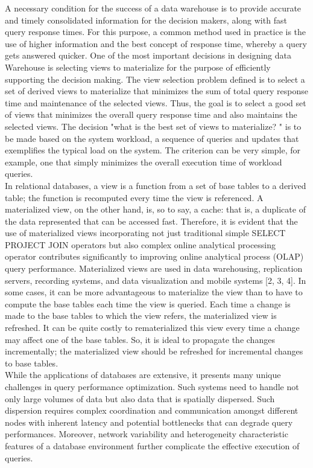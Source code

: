 A necessary condition for the success of a data warehouse is to provide accurate and timely consolidated information for the decision makers, along with fast query response times. For this purpose, a common method used in practice is the use of higher information and the best concept of response time, whereby a query gets answered quicker. One of the most important decisions in designing data Warehouse is selecting views to materialize for the purpose of efficiently supporting the decision making. The view selection problem defined is to select a set of derived views to materialize that minimizes the sum of total query response time  and  maintenance of the selected views. Thus, the goal is to select a good set of views that minimizes the overall query response time and also maintains the selected views. The decision "what is the best set of views to materialize? " is to be made based on the system workload, a sequence of queries and updates that exemplifies the typical load on the system. The criterion can be very simple, for example, one that simply minimizes the overall execution time of workload queries.\\
In relational databases, a view is a function from a set of base tables to a derived table; the function is recomputed every time the view is referenced. A materialized view, on the other hand, is, so to say, a cache: that is, a duplicate of the data represented that can be accessed fast. Therefore, it is evident that the use of materialized views incorporating not just traditional simple SELECT PROJECT JOIN operators but also complex online analytical processing operator contributes significantly to improving online analytical process (OLAP) query performance. Materialized views are used in data warehousing, replication servers, recording systems, and data visualization and mobile systems [2, 3, 4]. In some cases, it can be more advantageous to materialize the view than to have to compute the base tables each time the view is queried. Each time a change is made to the base tables to which the view refers, the materialized view is refreshed. It can be quite costly to rematerialized this view every time a change may affect one of the base tables. So, it is ideal to propagate the changes incrementally; the materialized view should be refreshed for incremental changes to base tables.\cite{Data_warehousing,efficient_incremental,rashid2009role}\\
While the applications of databases are extensive, it presents many unique challenges in query performance optimization. Such systems need to handle not only large volumes of data but also data that is spatially dispersed. Such dispersion requires complex coordination and communication amongst different nodes with inherent latency and potential bottlenecks that can degrade query performances. Moreover, network variability and heterogeneity characteristic features of a database environment further complicate the effective execution of queries.

